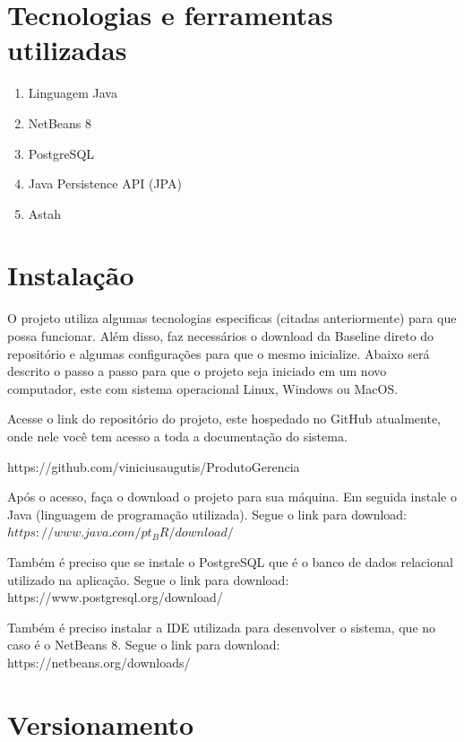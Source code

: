 \documentclass[	DIV=calc,%
							paper=a4,%
							fontsize=12pt,%
							onecolumn]{scrartcl}	 					%
\begin{document}
\section{Tecnologias e ferramentas utilizadas}
\begin{enumerate}
	\item Linguagem Java
	\item NetBeans 8
	\item PostgreSQL
	\item Java Persistence API (JPA)
	\item Astah
\end{enumerate}



\section{Instalação}
O projeto utiliza algumas tecnologias especificas (citadas
anteriormente) para que possa funcionar. Além disso, faz necessários o download da Baseline direto do
repositório e algumas configurações para que o mesmo inicialize.
Abaixo será descrito o passo a passo para que o projeto seja iniciado em um novo computador,
este com sistema operacional Linux, Windows ou MacOS. 

Acesse o link do repositório do projeto, este hospedado no GitHub atualmente, onde nele você tem acesso a toda a documentação do sistema.

https://github.com/viniciusaugutis/ProdutoGerencia

Após o acesso, faça o download o projeto para sua máquina.
Em seguida instale o Java (linguagem de programação utilizada). Segue o link para download: $https://www.java.com/pt_BR/download/$

Também é preciso que se instale o PostgreSQL que é o banco de dados relacional utilizado na aplicação. Segue o link para download: https://www.postgresql.org/download/

Também é preciso instalar a IDE utilizada para desenvolver o sistema, que no caso é o NetBeans 8. Segue o link para download:
https://netbeans.org/downloads/


\section{Versionamento}
\end{document}
